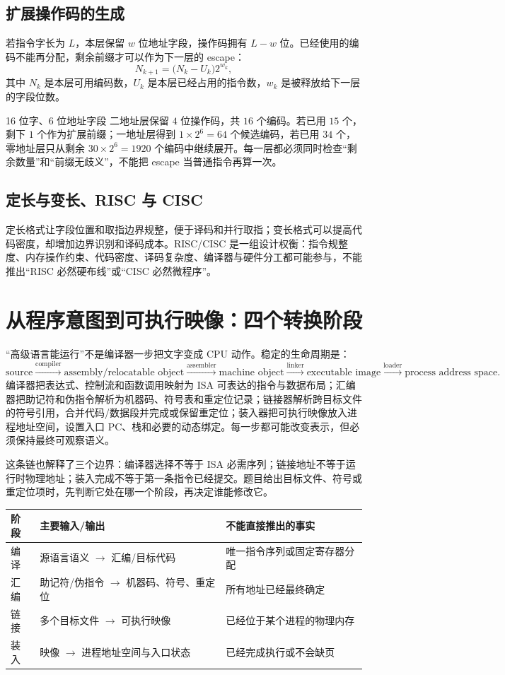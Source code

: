 \documentclass[UTF8,fontset=fandol,11pt,a4paper]{ctexart}
\begin{document}
\subsection{扩展操作码的生成}
若指令字长为 $L$，本层保留 $w$ 位地址字段，操作码拥有 $L-w$ 位。已经使用的编码不能再分配，剩余前缀才可以作为下一层的 escape：
\[
N_{k+1}=\bigl(N_k-U_k\bigr)2^{w_k},
\]
其中 $N_k$ 是本层可用编码数，$U_k$ 是本层已经占用的指令数，$w_k$ 是被释放给下一层的字段位数。

\begin{examplebox}{16 位字、6 位地址字段}
二地址层保留 $4$ 位操作码，共 $16$ 个编码。若已用 $15$ 个，剩下 $1$ 个作为扩展前缀；一地址层得到 $1\times2^6=64$ 个候选编码，若已用 $34$ 个，零地址层只从剩余 $30\times2^6=1920$ 个编码中继续展开。每一层都必须同时检查“剩余数量”和“前缀无歧义”，不能把 escape 当普通指令再算一次。
\end{examplebox}

\subsection{定长与变长、RISC 与 CISC}
定长格式让字段位置和取指边界规整，便于译码和并行取指；变长格式可以提高代码密度，却增加边界识别和译码成本。RISC/CISC 是一组设计权衡：指令规整度、内存操作约束、代码密度、译码复杂度、编译器与硬件分工都可能参与，不能推出“RISC 必然硬布线”或“CISC 必然微程序”。

\section{从程序意图到可执行映像：四个转换阶段}
“高级语言能运行”不是编译器一步把文字变成 CPU 动作。稳定的生命周期是：
\[
\text{source}\xrightarrow{\text{compiler}}\text{assembly/relocatable object}
\xrightarrow{\text{assembler}}\text{machine object}
\xrightarrow{\text{linker}}\text{executable image}
\xrightarrow{\text{loader}}\text{process address space}.
\]
编译器把表达式、控制流和函数调用映射为 ISA 可表达的指令与数据布局；汇编器把助记符和伪指令解析为机器码、符号表和重定位记录；链接器解析跨目标文件的符号引用，合并代码/数据段并完成或保留重定位；装入器把可执行映像放入进程地址空间，设置入口 PC、栈和必要的动态绑定。每一步都可能改变表示，但必须保持最终可观察语义。

这条链也解释了三个边界：编译器选择不等于 ISA 必需序列；链接地址不等于运行时物理地址；装入完成不等于第一条指令已经提交。题目给出目标文件、符号或重定位项时，先判断它处在哪一个阶段，再决定谁能修改它。

\begin{center}\small
\begin{tabularx}{\linewidth}{L{2.0cm}YY}
\toprule
阶段 & 主要输入/输出 & 不能直接推出的事实\\\midrule
编译 & 源语言语义 $\to$ 汇编/目标代码 & 唯一指令序列或固定寄存器分配\\
汇编 & 助记符/伪指令 $\to$ 机器码、符号、重定位 & 所有地址已经最终确定\\
链接 & 多个目标文件 $\to$ 可执行映像 & 已经位于某个进程的物理内存\\
装入 & 映像 $\to$ 进程地址空间与入口状态 & 已经完成执行或不会缺页\\
\bottomrule
\end{tabularx}\end{center}
\end{document}
